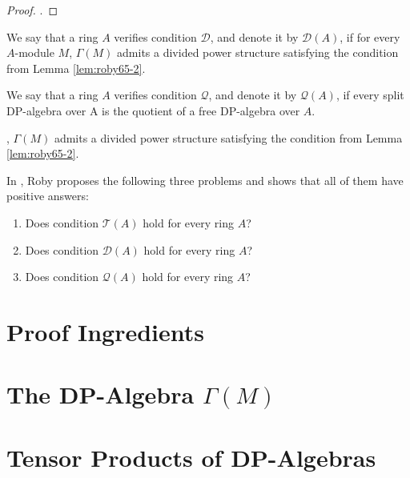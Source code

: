 \begin{proof}\leanok
	\cite[Lemme 2]{Roby65}.
\end{proof}

\begin{definition}
	\label{def:cond_D}
	\leanok
	We say that a ring $A$ verifies condition $\mathcal{D}$, and denote it by $\mathcal{D}(A)$, if for every $A$-module $M$, $\Gamma(M)$ admits a divided power structure satisfying the condition from Lemma \ref{lem:roby65-2}.
\end{definition}

\begin{definition}
	\label{def:cond_Q}
	\leanok
	We say that a ring $A$ verifies condition $\mathcal{Q}$, and denote it by $\mathcal{Q}(A)$, if every split DP-algebra over A is the quotient of a free DP-algebra over $A$.
	
	, $\Gamma(M)$ admits a divided power structure satisfying the condition from Lemma \ref{lem:roby65-2}.
\end{definition}


In \cite{Roby65}, Roby proposes the following three problems and shows that all of them have positive answers:
\begin{enumerate}
\item Does condition $\mathcal{T}(A)$ hold for every ring $A$?
\item Does condition $\mathcal{D}(A)$ hold for every ring $A$?
\item Does condition $\mathcal{Q}(A)$ hold for every ring $A$?
\end{enumerate}

\section{Proof Ingredients}

\section{The DP-Algebra \texorpdfstring{$\Gamma(M)$}{Gamma(M)}}

\section{Tensor Products of DP-Algebras}
